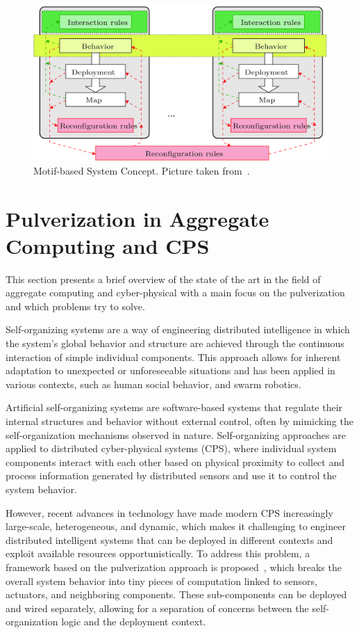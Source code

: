 \begin{figure}[ht]
	\centering
	\includegraphics[width=0.8\linewidth]{figures/motif-concept.png}
	\caption[Motif-based systems]{Motif-based System Concept. Picture taken from~\cite{10.1007/978-3-030-03424-5_20}.}
	\label{fig:motif-concept}
\end{figure}


\section{Pulverization in Aggregate Computing and CPS}
\label{sec:pulverization-aggregate-computing-cps}

This section presents a brief overview of the state of the art in the field of aggregate computing and cyber-physical with a main focus on the
pulverization and which problems try to solve.

Self-organizing systems are a way of engineering distributed intelligence in which the system's global behavior and structure are achieved through
the continuous interaction of simple individual components. This approach allows for inherent adaptation to unexpected or unforeseeable situations
and has been applied in various contexts, such as human social behavior, and swarm robotics.

Artificial self-organizing systems are software-based systems that regulate their internal structures and behavior without external control, often by
mimicking the self-organization mechanisms observed in nature. Self-organizing approaches are applied to distributed cyber-physical systems (CPS),
where individual system components interact with each other based on physical proximity to collect and process information generated by distributed
sensors and use it to control the system behavior.

However, recent advances in technology have made modern CPS increasingly large-scale, heterogeneous, and dynamic, which makes it challenging to
engineer distributed intelligent systems that can be deployed in different contexts and exploit available resources opportunistically. To address
this problem, a framework based on the pulverization approach is proposed~\cite{fi12110203}, which breaks the overall system behavior into tiny
pieces of computation linked to sensors, actuators, and neighboring components. These sub-components can be deployed and wired separately, allowing
for a separation of concerns between the self-organization logic and the deployment context.


